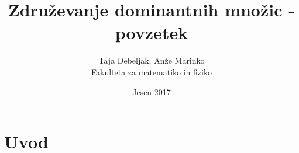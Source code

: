 \documentclass[a4paper]{article}
\title{Združevanje dominantnih množic - povzetek}
\author{Taja Debeljak, Anže Marinko \\ Fakulteta za matematiko in fiziko}
\date{Jesen 2017}
\begin{document}
\maketitle
\section{Uvod}
\end{document}
